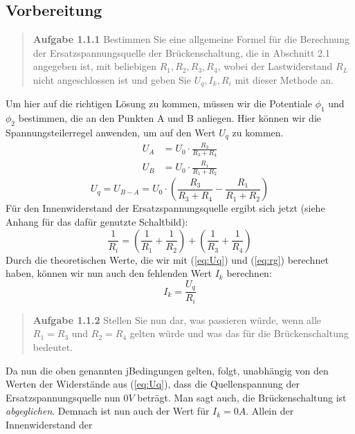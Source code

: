 \documentclass{scrarticle}
\begin{document}
\subsection{Vorbereitung}
\begin{abstract}
  \textbf{Aufgabe 1.1.1} Bestimmen Sie eine allgemeine Formel für die Berechnung der Ersatzspannungsquelle der Brückenschaltung,
  die in Abschnitt 2.1 angegeben ist, mit beliebigen $R_1, R_2, R_3, R_4$, wobei der Lastwiderstand $R_L$ nicht angeschlossen ist
  und geben Sie $U_q, I_k, R_i$ mit dieser Methode an.
\end{abstract}
Um hier auf die richtigen Lösung zu kommen, müssen wir die Potentiale $\phi_1$ und $\phi_2$ bestimmen, die an den Punkten A und B anliegen.
Hier können wir die Spannungsteilerregel anwenden, um auf den Wert $U_q$ zu kommen.
\begin{equation*}
  \begin{aligned}
    U_A &= U_0 \cdot \frac{R_3}{R_3+R_4}\\
    U_B &= U_0 \cdot \frac{R_1}{R_1+R_2}
  \end{aligned}
\end{equation*}
\begin{equation}\label{eq:Uq}
  U_q = U_{B-A} = U_0 \cdot \left(\frac{R_3}{R_3+R_4} - \frac{R_1}{R_1+R_2}\right)
\end{equation}
Für den Innenwiderstand der Ersatzspannungsquelle ergibt sich jetzt (siehe Anhang für das dafür genutzte Schaltbild):
\begin{equation}\label{eq:rg}
  \frac{1}{R_i} = \left(\frac{1}{R_1} + \frac{1}{R_2}\right) + \left(\frac{1}{R_3} + \frac{1}{R_4}\right)
\end{equation}
Durch die theoretischen Werte, die wir mit (\ref{eq:Uq}) und (\ref{eq:rg}) berechnet haben, können wir nun auch den fehlenden Wert $I_k$ berechnen:
\begin{equation}
  \label{eq:Ik}
  I_k = \frac{U_q}{R_i}
\end{equation}
\begin{abstract}
  \textbf{Aufgabe 1.1.2} Stellen Sie nun dar, was passieren würde, wenn alle $R_1 = R_3$ und $R_2 = R_4$
  gelten würde und was das für die Brückenschaltung bedeutet.
\end{abstract}
Da nun die oben genannten jBedingungen gelten, folgt, unabhängig von den Werten der Widerstände aus (\ref{eq:Uq}), dass 
die Quellenspannung der Ersatzspannungsquelle nun $0V$ beträgt. Man sagt auch, die Brückenschaltung ist \textit{abgeglichen}. Demnach ist nun auch der Wert für $I_k = 0A$. Allein der Innenwiderstand der 
\end{document}
